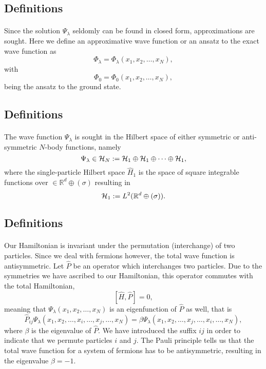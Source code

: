 \documentclass[%
twoside,                 %
final,                   %
10pt]{article}
\begin{document}
\subsection{Definitions}

\paragraph{}
Since the solution $\Psi_{\lambda}$ seldomly can be found in closed form, approximations are sought. Here we define an approximative wave function or an ansatz to the exact wave function as 
\[
\Phi_{\lambda}=\Phi_{\lambda}(x_1,x_2,\dots,x_N),
\]
with
\[
\Phi_0=\Phi_0(x_1,x_2,\dots,x_N),
\]
being the ansatz to the ground state.




\subsection{Definitions}

\paragraph{}
The wave function $\Psi_{\lambda}$ is sought in the Hilbert space of either symmetric or anti-symmetric $N$-body functions, namely
\[
\Psi_{\lambda}\in {\cal H}_N:= {\cal H}_1\oplus{\cal H}_1\oplus\dots\oplus{\cal H}_1,
\]
where the single-particle Hilbert space $\hat{H}_1$ is the space of square integrable functions over
$\in {\mathbb{R}}^{d}\oplus (\sigma)$
resulting in
\[
{\cal H}_1:= L^2(\mathbb{R}^{d}\oplus (\sigma)).
\]





\subsection{Definitions}

\paragraph{}
Our Hamiltonian is invariant under the permutation (interchange) of two particles.
Since we deal with fermions however, the total wave function is antisymmetric.
Let $\hat{P}$ be an operator which interchanges two particles.
Due to the symmetries we have ascribed to our Hamiltonian, this operator commutes with the total Hamiltonian,
\[
[\hat{H},\hat{P}] = 0,
\]
meaning that $\Psi_{\lambda}(x_1, x_2, \dots , x_N)$ is an eigenfunction of 
$\hat{P}$ as well, that is
\[
\hat{P}_{ij}\Psi_{\lambda}(x_1, x_2, \dots,x_i,\dots,x_j,\dots,x_N)=
\beta\Psi_{\lambda}(x_1, x_2, \dots,x_j,\dots,x_i,\dots,x_N),
\]
where $\beta$ is the eigenvalue of $\hat{P}$. We have introduced the suffix $ij$ in order to indicate that we permute particles $i$ and $j$.
The Pauli principle tells us that the total wave function for a system of fermions
has to be antisymmetric, resulting in the eigenvalue $\beta = -1$.
\end{document}
